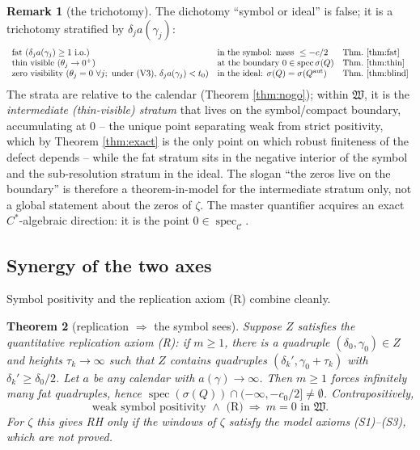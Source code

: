 \documentclass[11pt,reqno]{amsart}
\newtheorem{theorem}{Theorem}[section]
\theoremstyle{definition}
\newtheorem{remark}[theorem]{Remark}
\newcommand{\Cor}{\mathcal{C}}
\newcommand{\spec}{\operatorname{spec}}
\newcommand{\Qaut}{Q^{\mathrm{aut}}}
\begin{document}
\begin{remark}[the trichotomy]\label{rem:trichotomy}
The dichotomy ``symbol or ideal'' is false; it is a trichotomy stratified by
\(\delta_j a(\gamma_j)\):
\[
\begin{array}{lll}
\text{fat }(\delta_j a(\gamma_j)\geq1\text{ i.o.}) &
\text{in the symbol: mass }\leq-c/2 & \text{Thm.\ \ref{thm:fat}}\\
\text{thin visible }(\theta_j\to0^+) &
\text{at the boundary }0\in\spec\sigma(Q) & \text{Thm.\ \ref{thm:thin}}\\
\text{zero visibility }(\theta_j=0\ \forall j;\text{ under (V3), }\delta_ja(\gamma_j)<t_0) &
\text{in the ideal: }\sigma(Q)=\sigma(\Qaut) & \text{Thm.\ \ref{thm:blind}}
\end{array}
\]
The strata are relative to the calendar (Theorem \ref{thm:nogo}); within
\(\mathfrak W\), it is the \emph{intermediate (thin-visible) stratum} that lives
on the symbol/compact boundary, accumulating at \(0\) -- the unique point
separating weak from strict positivity, which by Theorem \ref{thm:exact} is the
only point on which robust finiteness of the defect depends -- while the fat
stratum sits in the negative interior of the symbol and the sub-resolution
stratum in the ideal. The slogan ``the zeros live on the boundary'' is therefore
a theorem-in-model for the intermediate stratum only, not a global statement
about the zeros of \(\zeta\). The master quantifier acquires an
exact \(C^*\)-algebraic direction: it is the point \(0\in\spec_{\Cor}\).
\end{remark}

\subsection{Synergy of the two axes}
Symbol positivity and the replication axiom (R) combine cleanly.

\begin{theorem}[replication \(\Rightarrow\) the symbol sees]\label{thm:synergy}
Suppose \(Z\) satisfies the quantitative replication axiom \emph{(R)}: if
\(m\geq1\), there is a quadruple \((\delta_0,\gamma_0)\in Z\) and heights
\(\tau_k\to\infty\) such that \(Z\) contains quadruples
\((\delta_k',\gamma_0+\tau_k)\) with \(\delta_k'\geq\delta_0/2\). Let \(a\) be any
calendar with \(a(\gamma)\to\infty\). Then \(m\geq1\) forces infinitely many fat
quadruples, hence
\(\spec(\sigma(Q))\cap(-\infty,-c_0/2]\neq\emptyset\). Contrapositively,
\[
\text{weak symbol positivity }\wedge\text{ (R)}\ \Longrightarrow\ m=0
\text{ in }\mathfrak W.
\]
For \(\zeta\) this gives RH only if the windows of \(\zeta\) satisfy the model
axioms (S1)--(S3), which are not proved.
\end{theorem}
\end{document}
